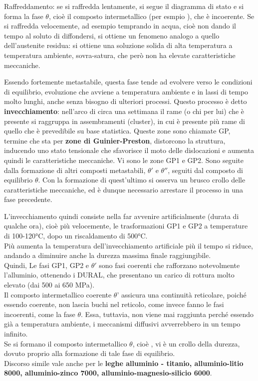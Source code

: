 Raffreddamento: se si raffredda lentamente, si segue il diagramma di stato e si forma la fase $\theta$, cioè il composto intermetallico (per esmpio ), che è incoerente. Se si raffredda velocemente, ad esempio temprando in acqua, cioè non dando il tempo al soluto di diffondersi, si ottiene un fenomeno analogo a quello dell’austenite residua: si ottiene una soluzione solida di alta temperatura a temperatura ambiente, sovra-satura, che però non ha elevate caratteristiche meccaniche. 

Essendo fortemente metastabile, questa fase tende ad evolvere verso le condizioni di equilibrio, evoluzione che avviene a temperatura ambiente e in lassi di tempo molto lunghi, anche senza bisogno di ulteriori processi. Questo processo è detto \textbf{invecchiamento}: nell’arco di circa una settimana il rame (o chi per lui) che è presente si raggruppa in assembramenti (cluster), in cui è presente più rame di quello che è prevedibile su base statistica. Queste zone sono chiamate GP, termine che sta per \textbf{zone di Guinier-Preston}, distorcono la struttura, inducendo uno stato tensionale che sfavorisce il moto delle dislocazioni e aumenta quindi le caratteristiche meccaniche. Vi sono le zone GP1 e GP2. Sono seguite dalla formazione di altri composti metastabili, $\theta'$ e $\theta''$, seguiti dal composto di equilibrio $\theta$. Con la formazione di quest'ultimo si osserva un brusco crollo delle caratteristiche meccaniche, ed è dunque necessario arrestare il processo in una fase precedente.

L’invecchiamento quindi consiste nella far avvenire artificialmente (durata di qualche ora), cioè più velocemente, le trasformazioni GP1 e GP2 a temperature di 100-120°C, dopo un riscaldamento di 500°C.\\
Più aumenta la temperatura dell’invecchiamento artificiale più il tempo si riduce, andando a diminuire anche la durezza massima finale raggiungibile.\\
Quindi, Le fasi GP1, GP2 e $\theta'$ sono fasi coerenti che rafforzano notevolmente l’alluminio, ottenendo i DURAL, che presentano un carico di rottura molto elevato (dai 500 ai 650 MPa).\\
Il composto intermetallico coerente $\theta$’ assicura una continuità reticolare, poiché essendo coerente, non lascia buchi nel reticolo, come invece fanno le fasi incoerenti, come la fase $\theta$. Essa, tuttavia, non viene mai raggiunta perché essendo già a temperatura ambiente, i meccanismi diffusivi avverrebbero in un tempo infinito.\\
Se si formano il composto intermetallico $\theta$, cioè , vi è un crollo della durezza, dovuto proprio alla formazione di tale fase di equilibrio.\\
Discorso simile vale anche per le \textbf{leghe alluminio - titanio, alluminio-litio 8000, alluminio-zinco 7000, alluminio-magnesio-silicio 6000}.

